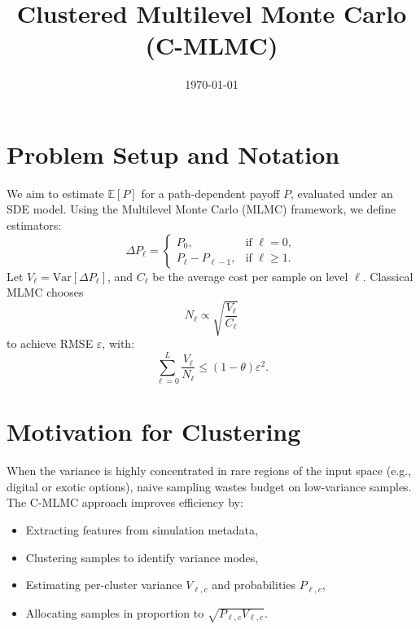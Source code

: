 \documentclass{article}
\title{Clustered Multilevel Monte Carlo (C-MLMC)}
\date{\today}
\begin{document}
\maketitle

\section{Problem Setup and Notation}
We aim to estimate \( \mathbb{E}[P] \) for a path-dependent payoff \( P \), evaluated under an SDE model. Using the Multilevel Monte Carlo (MLMC) framework, we define estimators:
\[
\Delta P_\ell =
\begin{cases}
P_0, & \text{if } \ell = 0, \\
P_\ell - P_{\ell-1}, & \text{if } \ell \ge 1.
\end{cases}
\]
Let \( V_\ell = \mathrm{Var}[\Delta P_\ell] \), and \( C_\ell \) be the average cost per sample on level \( \ell \). Classical MLMC chooses
\[
N_\ell \propto \sqrt{\frac{V_\ell}{C_\ell}}
\]
to achieve RMSE \( \varepsilon \), with:
\[
\sum_{\ell=0}^L \frac{V_\ell}{N_\ell} \le (1 - \theta)\varepsilon^2.
\]

\section{Motivation for Clustering}
When the variance is highly concentrated in rare regions of the input space (e.g., digital or exotic options), naive sampling wastes budget on low-variance samples. The C-MLMC approach improves efficiency by:
\begin{itemize}
  \item Extracting features from simulation metadata,
  \item Clustering samples to identify variance modes,
  \item Estimating per-cluster variance \( V_{\ell,c} \) and probabilities \( P_{\ell,c} \),
  \item Allocating samples in proportion to \( \sqrt{P_{\ell,c} V_{\ell,c}} \).
\end{itemize}
\end{document}
